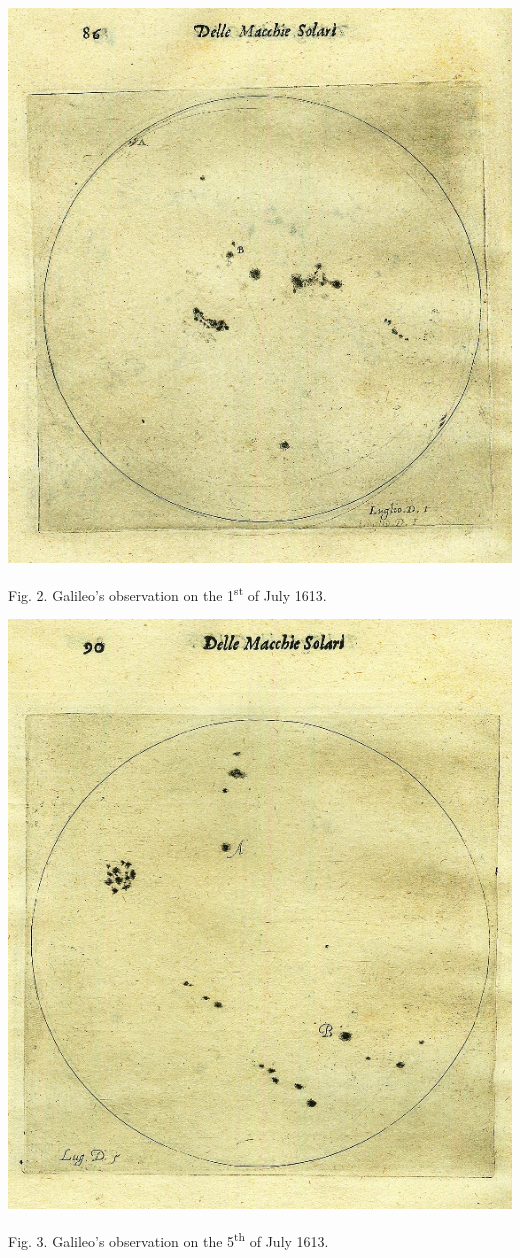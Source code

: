 \begin{artengenv}
{\centering  \includegraphics{Sierotowiczorg-img002.jpg} \par}
{\centering
Fig. 2. Galileo’s observation on the 1\textsuperscript{st} of July 1613.
\par}

{\centering  \includegraphics{Sierotowiczorg-img003.jpg} \par}
{\centering
Fig. 3. Galileo’s observation on the 5\textsuperscript{th} of July 1613.
\par}


\end{artengenv}
